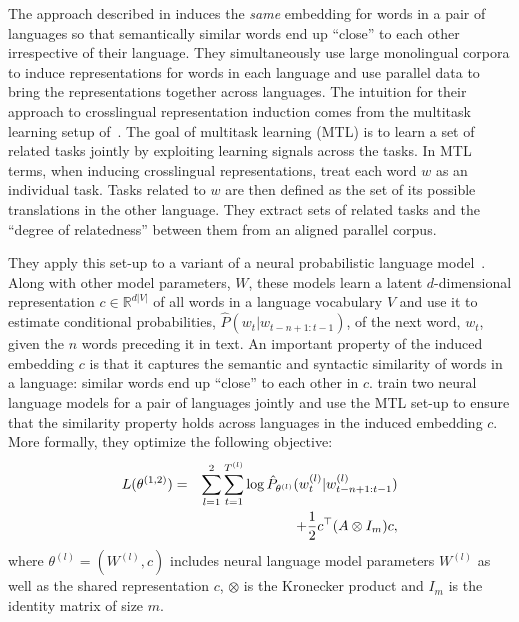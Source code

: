\documentclass[11pt]{article}
\begin{document}
The approach described in  induces the \emph{same} embedding for words in a pair of languages so that semantically similar words end up ``close'' to each other irrespective of their language.  
They simultaneously use large monolingual corpora to induce representations for words in each language and use parallel data to bring the representations together across languages.  
The intuition for their approach to crosslingual representation induction comes from the multitask learning setup of~.  The goal of multitask learning (MTL) is to learn a set of related tasks jointly by exploiting learning signals across the tasks.  
In MTL terms, when inducing crosslingual representations,  treat each word $w$ %
as an individual task.  
Tasks related to $w$ are then defined as the set of its possible translations in the other language.  
They extract sets of related tasks and the ``degree of relatedness'' between them from an aligned parallel corpus.

They apply this set-up to a variant of a neural probabilistic language model~\cite{Bengio:2003}.  
Along with other model parameters, $W$, these models learn a latent $d$-dimensional representation $c \in \mathbb{R}^{d|V|}$ of all words in a language vocabulary $V$ and use it to estimate conditional probabilities, $\hat{P}(w_t | w_{t-n+1:t-1})$, of the next word, $w_t$, given the $n$ words preceding it in text.  
An important property of the induced embedding $c$ is that it captures the semantic and syntactic similarity of words in a language: similar words end up ``close'' to each other in $c$.   train two neural language models for a pair of languages jointly and use the MTL set-up to ensure that the similarity property holds across languages in the induced embedding $c$.  More formally, they optimize the following objective:
\begin{eqnarray}
 L(\theta^{(1,2)}) & = & \sum_{l=1}^{2} {\sum_{t = 1}^{T^{(l)}} \log \hat{P}_{\theta^{(l)}}(w^{(l)}_t | w^{(l)}_{t-n+1:t-1})} \nonumber \\
 &&+ {1  \over 2} c^{\top} (A \otimes I_m) c, \nonumber
 \end{eqnarray}
where $\theta^{(l)} = (W^{(l)}, c)$ includes neural language model parameters $W^{(l)}$ as well as the shared  representation $c$, $\otimes$ is the Kronecker product and $I_m$ is the identity 
matrix of size $m$.  
\end{document}
